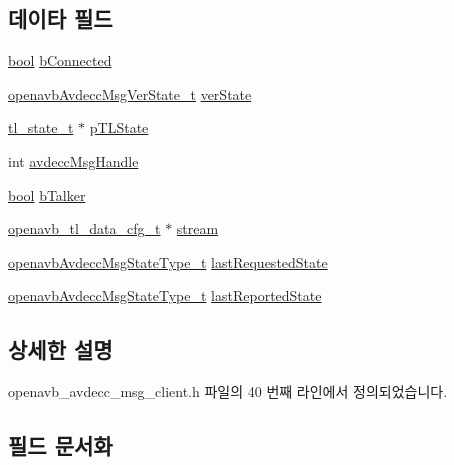 \subsection*{데이타 필드}
\begin{DoxyCompactItemize}
\item 
\hyperlink{avb__gptp_8h_af6a258d8f3ee5206d682d799316314b1}{bool} \hyperlink{struct__avdecc__msg__state_a27fec7db63617379ec20651b83d27fc7}{b\+Connected}
\item 
\hyperlink{openavb__avdecc__msg_8h_a547bcd87b12d57a9d9b7a1d8886e332c}{openavb\+Avdecc\+Msg\+Ver\+State\+\_\+t} \hyperlink{struct__avdecc__msg__state_a9739291b2bb9fba83a1eb09aaeb4dc92}{ver\+State}
\item 
\hyperlink{structtl__state__t}{tl\+\_\+state\+\_\+t} $\ast$ \hyperlink{struct__avdecc__msg__state_a442eb370b9ed2c74607fcaaecc9fef2a}{p\+T\+L\+State}
\item 
int \hyperlink{struct__avdecc__msg__state_a0ec8286c7813affa4fbe99bc5ce31f5a}{avdecc\+Msg\+Handle}
\item 
\hyperlink{avb__gptp_8h_af6a258d8f3ee5206d682d799316314b1}{bool} \hyperlink{struct__avdecc__msg__state_a0d87b8d47bb02e4d8e93b056d72f870c}{b\+Talker}
\item 
\hyperlink{openavb__avdecc__read__ini__pub_8h_a2c6c3608b0b8c34af5fa95c11753cfc0}{openavb\+\_\+tl\+\_\+data\+\_\+cfg\+\_\+t} $\ast$ \hyperlink{struct__avdecc__msg__state_a92c9ac28f244e59bcba3681be48f1c86}{stream}
\item 
\hyperlink{openavb__avdecc__msg_8h_a6d563e9a9b24941adb933082f8609d76}{openavb\+Avdecc\+Msg\+State\+Type\+\_\+t} \hyperlink{struct__avdecc__msg__state_ab772ed066355c575afa9a27c1d654c36}{last\+Requested\+State}
\item 
\hyperlink{openavb__avdecc__msg_8h_a6d563e9a9b24941adb933082f8609d76}{openavb\+Avdecc\+Msg\+State\+Type\+\_\+t} \hyperlink{struct__avdecc__msg__state_a9e84fb07ee536b1bca410ee6c9eebea5}{last\+Reported\+State}
\end{DoxyCompactItemize}


\subsection{상세한 설명}


openavb\+\_\+avdecc\+\_\+msg\+\_\+client.\+h 파일의 40 번째 라인에서 정의되었습니다.



\subsection{필드 문서화}
